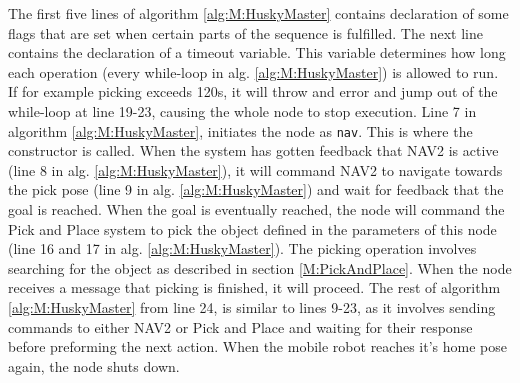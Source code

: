 The first five lines of algorithm \ref{alg:M:HuskyMaster} contains declaration of some flags that are set when certain parts of the sequence is fulfilled. The next line contains the declaration of a timeout variable. This variable determines how long each operation (every while-loop in alg. \ref{alg:M:HuskyMaster}) is allowed to run. If for example picking exceeds 120s, it will throw and error and jump out of the while-loop at line 19-23, causing the whole node to stop execution.  Line 7 in algorithm \ref{alg:M:HuskyMaster}, initiates the node as \lstinline{nav}. This is where the constructor is called. When the system has gotten feedback that NAV2 is active (line 8 in alg. \ref{alg:M:HuskyMaster}), it will command NAV2 to navigate towards the pick pose (line 9 in alg. \ref{alg:M:HuskyMaster}) and wait for feedback that the goal is reached. When the goal is eventually reached, the node will command the Pick and Place system to pick the object defined in the parameters of this node (line 16 and 17 in alg. \ref{alg:M:HuskyMaster}). The picking operation involves searching for the object as described in section \ref{M:PickAndPlace}. When the node receives a message that picking is finished, it will proceed. The rest of algorithm \ref{alg:M:HuskyMaster} from line 24, is similar to lines 9-23, as it involves sending commands to either NAV2 or Pick and Place and waiting for their response before preforming the next action. When the mobile robot reaches it's home pose again, the node shuts down.












